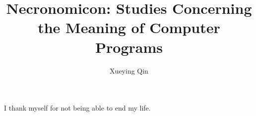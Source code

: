 \documentclass[phd,icsa,twoside,logo]{infthesis}
\title{Necronomicon: Studies Concerning the Meaning of Computer Programs}
\author{Xueying Qin}
\begin{document}
\begin{preliminary}

\maketitle

\begin{acknowledgements}
I thank myself for not being able to end my life.
\end{acknowledgements}

\standarddeclaration


\tableofcontents


\end{preliminary}







% 

\appendix







\end{document}
